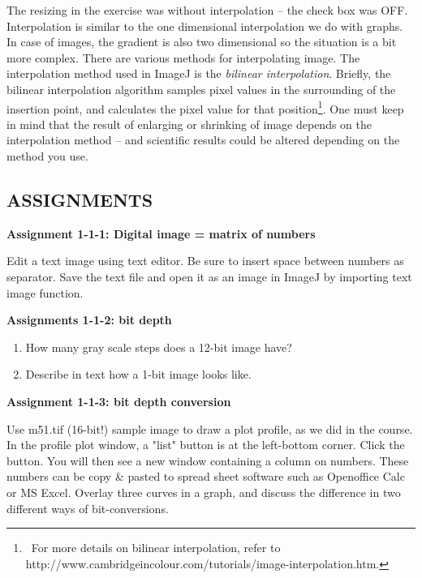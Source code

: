 The resizing in the exercise was without interpolation -- the check box
was OFF. Interpolation is similar to the one dimensional interpolation
we do with graphs. In case of images, the gradient is also two
dimensional so the situation is a bit more complex. There are various
methods for interpolating image. The interpolation method used in
ImageJ is the \textit{bilinear interpolation}. Briefly, the bilinear
interpolation algorithm samples pixel values in the surrounding of the
insertion point, and calculates the pixel value for that
position\footnote{\ For more details on bilinear interpolation, refer
to\\
http://www.cambridgeincolour.com/tutorials/image-interpolation.htm.}.
One must keep in mind that the result of enlarging or shrinking of
image depends on the interpolation method -- and scientific results
could be altered depending on the method you use.

\clearpage
\subsection{ASSIGNMENTS }%

\textbf{\sffamily
Assignment 1-1-1: Digital image = matrix of numbers}

Edit a text image using text editor. Be sure to insert space between
numbers as separator. Save the text file and open it as an image in
ImageJ by importing text image function. \ \ 

\textbf{\sffamily
Assignments 1-1-2: bit depth}
\begin{enumerate}
\item How many gray scale steps does a 12-bit image have?\\
\item Describe in text how a 1-bit image looks like.
\end{enumerate}

\textbf{\sffamily
Assignment 1-1-3: bit depth conversion}

Use m51.tif (16-bit!) sample image to draw a plot profile, as we did in
the course. In the profile plot window, a
"list" button is at the left-bottom corner.
Click the button. You will then see a new window containing a column on
numbers. These numbers can be copy \& pasted to spread sheet software
such as Openoffice Calc or MS Excel. Overlay three curves in a graph,
and discuss the difference in two different ways of bit-conversions. 

